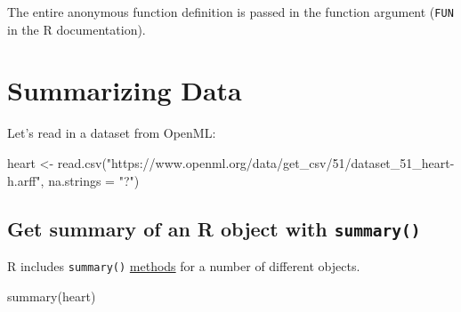 \documentclass[
]{book}
\newenvironment{Shaded}{\begin{snugshade}}{\end{snugshade}}
\newcommand{\AttributeTok}[1]{\textcolor[rgb]{0.77,0.63,0.00}{#1}}
\newcommand{\FunctionTok}[1]{\textcolor[rgb]{0.00,0.00,0.00}{#1}}
\newcommand{\NormalTok}[1]{#1}
\newcommand{\OtherTok}[1]{\textcolor[rgb]{0.56,0.35,0.01}{#1}}
\newcommand{\StringTok}[1]{\textcolor[rgb]{0.31,0.60,0.02}{#1}}
\begin{document}
The entire anonymous function definition is passed in the function argument (\texttt{FUN} in the R documentation).

\hypertarget{summarize}{%
\chapter{Summarizing Data}\label{summarize}}

Let's read in a dataset from OpenML:

\begin{Shaded}
\begin{Highlighting}[]
\NormalTok{heart }\OtherTok{\textless{}{-}} \FunctionTok{read.csv}\NormalTok{(}\StringTok{"https://www.openml.org/data/get\_csv/51/dataset\_51\_heart{-}h.arff"}\NormalTok{,}
                  \AttributeTok{na.strings =} \StringTok{"?"}\NormalTok{)}
\end{Highlighting}
\end{Shaded}

\hypertarget{get-summary-of-an-r-object-with-summary}{%
\section{\texorpdfstring{Get summary of an R object with \texttt{summary()}}{Get summary of an R object with summary()}}\label{get-summary-of-an-r-object-with-summary}}

R includes \texttt{summary()} \protect\hyperlink{s3methods}{methods} for a number of different objects.

\begin{Shaded}
\begin{Highlighting}[]
\FunctionTok{summary}\NormalTok{(heart)}
\end{Highlighting}
\end{Shaded}
\end{document}
